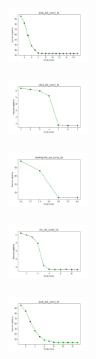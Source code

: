 \begin{figure}[H]
    \hfill
    \begin{subfigure}
        \centering
        \includegraphics[width=0.234\textwidth]{img/es/ecoli_set_const_10_589741062_cost.png}
    \end{subfigure}
    \hfill
    \begin{subfigure}
        \centering
        \includegraphics[width=0.234\textwidth]{img/es/rand_set_const_10_589741062_cost.png}
    \end{subfigure}
    \hfill
    \begin{subfigure}
        \centering
        \includegraphics[width=0.234\textwidth]{img/es/newthyroid_set_const_10_589741062_cost.png}
    \end{subfigure}
    \hfill
    \begin{subfigure}
        \centering
        \includegraphics[width=0.234\textwidth]{img/es/iris_set_const_10_277451237_cost.png}
    \end{subfigure}
    \hfill
    \begin{subfigure}
        \centering
        \includegraphics[width=0.234\textwidth]{img/es/ecoli_set_const_10_277451237_cost.png}
    \end{subfigure}
    \hfill
    \begin{subfigure}
        \centering

\end{subfigure}
\end{figure}
